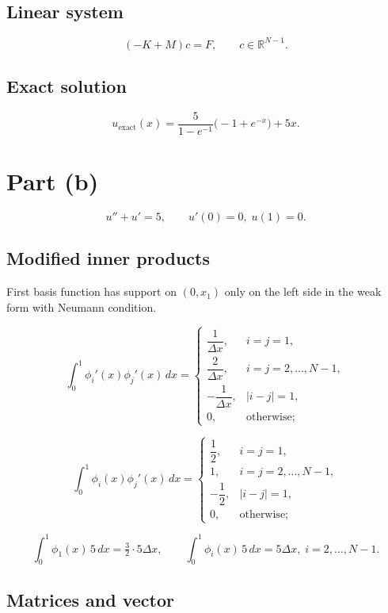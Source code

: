 \documentclass{article}
\begin{document}
\subsection*{Linear system}

\[
(-K+M)c=F,\qquad c\in\mathbb R^{N-1}.
\]

\subsection*{Exact solution}

\[
u_{\mathrm{exact}}(x)=\frac{5}{1-e^{-1}}\bigl(-1+e^{-x}\bigr)+5x.
\]

\section*{Part (b)}

\[
u''+u'=5,\qquad u'(0)=0,\;u(1)=0.
\]

\subsection*{Modified inner products}

First basis function has support on $(0,x_1)$ only on the left side in the weak form with Neumann condition.

\[
\int_0^1\phi_i'(x)\phi_j'(x)\,dx=
\begin{cases}
\dfrac{1}{\Delta x}, & i=j=1,\\[6pt]
\dfrac{2}{\Delta x}, & i=j=2,\dots ,N-1,\\[6pt]
-\dfrac{1}{\Delta x}, & |i-j|=1,\\[6pt]
0, & \text{otherwise};
\end{cases}
\]

\[
\int_0^1\phi_i(x)\phi_j'(x)\,dx=
\begin{cases}
\dfrac12, & i=j=1,\\[6pt]
1, & i=j=2,\dots ,N-1,\\[6pt]
-\dfrac12, & |i-j|=1,\\[6pt]
0, & \text{otherwise};
\end{cases}
\]

\[
\int_0^1\phi_1(x)\,5\,dx=\tfrac32\cdot5\Delta x,\qquad
\int_0^1\phi_i(x)\,5\,dx=5\Delta x,\;i=2,\dots ,N-1.
\]

\subsection*{Matrices and vector}
\end{document}
